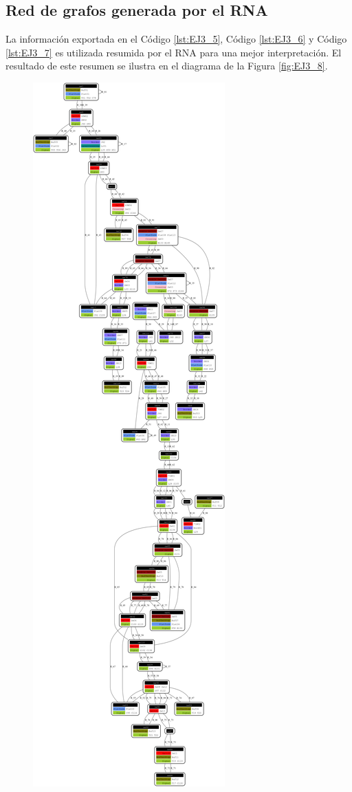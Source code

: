 \subsection{Red de grafos generada por el RNA}

	La información exportada en el Código \ref{lst:EJ3_5}, Código \ref{lst:EJ3_6} y Código \ref{lst:EJ3_7} es utilizada resumida por el RNA para una mejor interpretación. El resultado de este resumen se ilustra en el diagrama de la Figura \ref{fig:EJ3_8}.
	
	\begin{figure}[H]
		\centering
		\includegraphics[origin = c, width=\textwidth]{Figuras/Graph_3}

\end{figure}
